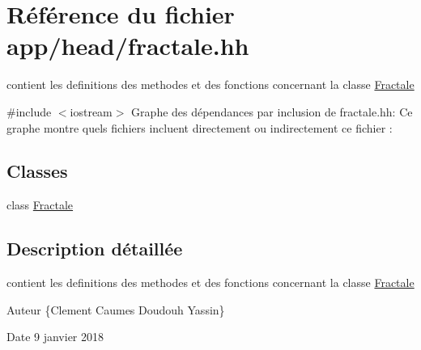 \hypertarget{fractale_8hh}{}\section{Référence du fichier app/head/fractale.hh}
\label{fractale_8hh}


contient les definitions des methodes et des fonctions concernant la classe \hyperlink{classFractale}{Fractale}  


{\ttfamily \#include $<$iostream$>$}\newline
Graphe des dépendances par inclusion de fractale.\+hh\+:
Ce graphe montre quels fichiers incluent directement ou indirectement ce fichier \+:
\subsection*{Classes}
\begin{DoxyCompactItemize}
\item 
class \hyperlink{classFractale}{Fractale}
\end{DoxyCompactItemize}


\subsection{Description détaillée}
contient les definitions des methodes et des fonctions concernant la classe \hyperlink{classFractale}{Fractale} 

\begin{DoxyAuthor}{Auteur}
\{Clement Caumes Doudouh Yassin\} 
\end{DoxyAuthor}
\begin{DoxyDate}{Date}
9 janvier 2018 
\end{DoxyDate}
